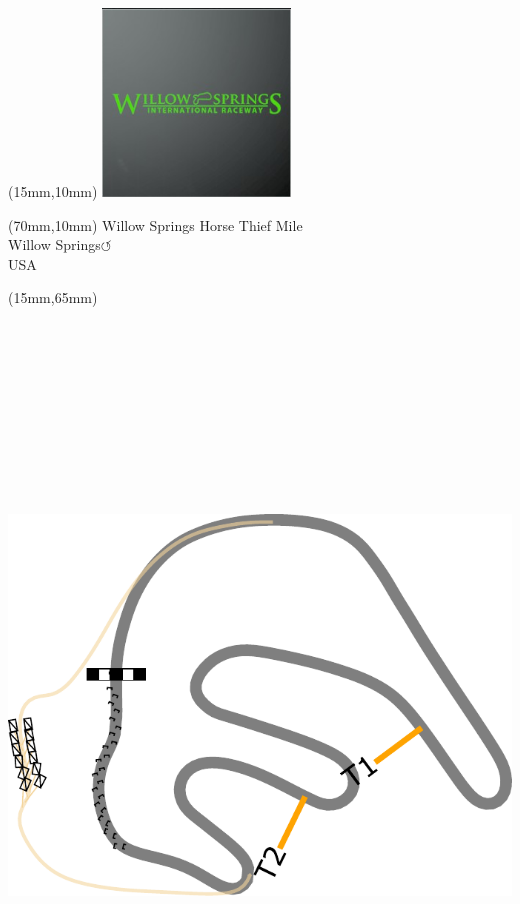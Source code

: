 \null\newpage
\begin{textblock*}{50mm}(15mm,10mm)%
\includegraphics[width=50mm]{LG/2015-05-20_00098.png}
\end{textblock*}
\begin{textblock*}{130mm}(70mm,10mm)%
{\fontsize{20}{20}\selectfont Willow Springs Horse Thief Mile\\}
{\fontsize{16}{16}\selectfont Willow Springs\hfill \huge$\circlearrowleft$\\}
{\fontsize{12}{12}\selectfont USA\\}
\end{textblock*}
\begin{textblock*}{185mm}(15mm,65mm)%
\centering
\mbox{\includegraphics[width=185mm,height=210mm,keepaspectratio]{PT/WSPHTM.pdf}}
\end{textblock*}

